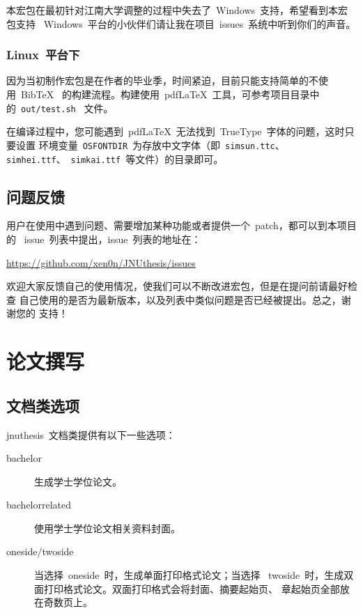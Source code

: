 \documentclass[pdftex, twoside, bachelor]{JNUthesis}
\begin{document}
\begin{spacing}{1.25}
本宏包在最初针对江南大学调整的过程中失去了~Windows~支持，希望看到本宏包支持~
Windows~平台的小伙伴们请让我在项目~issues~系统中听到你们的声音。

\subsection{Linux~平台下}

因为当初制作宏包是在作者的毕业季，时间紧迫，目前只能支持简单的不使用~BibTeX~
的构建流程。构建使用~pdf\LaTeX{}~工具，可参考项目目录中的~\texttt{out/test.sh}~
文件。

在编译过程中，您可能遇到~pdf\LaTeX{}~无法找到~TrueType~字体的问题，这时只要设置
环境变量~\texttt{OSFONTDIR}~为存放中文字体（即~\texttt{simsun.ttc}、~
\texttt{simhei.ttf}、~\texttt{simkai.ttf}~等文件）的目录即可。

\section{问题反馈}

用户在使用中遇到问题、需要增加某种功能或者提供一个~patch，都可以到本项目的
~issue~列表中提出，issue~列表的地址在：

\begin{center}
\url{https://github.com/xen0n/JNUthesis/issues}
\end{center}

欢迎大家反馈自己的使用情况，使我们可以不断改进宏包，但是在提问前请最好检查
自己使用的是否为最新版本，以及列表中类似问题是否已经被提出。总之，谢谢您的
支持！

\chapter{论文撰写}

\section{文档类选项}

jnuthesis~文档类提供有以下一些选项：

\begin{description}

\item[bachelor] 生成学士学位论文。

\item[bachelorrelated] 使用学士学位论文相关资料封面。

\item[oneside/twoside] 当选择~oneside~时，生成单面打印格式论文；当选择
~twoside~时，生成双面打印格式论文。双面打印格式会将封面、摘要起始页、
章起始页全部放在奇数页上。


\end{description}
\end{spacing}
\end{document}
